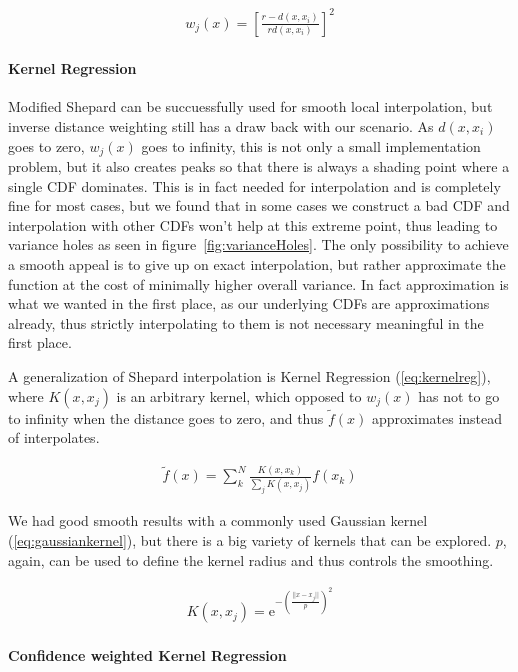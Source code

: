 \begin{align}\label{eq:modshep}
w_j(x) = \left[ \frac{ r - d(x, x_i)}{ rd(x, x_i) } \right]^2
\end{align}

\paragraph{Kernel Regression}

Modified Shepard can be succuessfully used for smooth local interpolation, but inverse distance weighting still has a draw back with our scenario. As $d(x, x_i)$ goes to zero, $w_j(x)$ goes to infinity, this is not only a small implementation problem, but it also creates peaks so that there is always a shading point where a single CDF dominates. This is in fact needed for interpolation and is completely fine for most cases, but we found that in some cases we construct a bad CDF and interpolation with other CDFs won't help at this extreme point, thus leading to variance holes as seen in figure~\ref{fig:varianceHoles}. The only possibility to achieve a smooth appeal is to give up on exact interpolation, but rather approximate the function at the cost of minimally higher overall variance. In fact approximation is what we wanted in the first place, as our underlying CDFs are approximations already, thus strictly interpolating to them is not necessary meaningful in the first place.

A generalization of Shepard interpolation is Kernel Regression (\ref{eq:kernelreg}), where $K(x, x_j)$ is an arbitrary kernel, which opposed to $w_j(x)$ has not to go to infinity when the distance goes to zero, and thus $\widetilde{f}(x)$ approximates instead of interpolates. 

\begin{align}\label{eq:kernelreg}
\widetilde{f}(x) = \sum_{k}^{N}\frac{K(x,x_k)}{\sum\nolimits_{j}K(x, x_j)}f(x_k)
\end{align}

We had good smooth results with a commonly used Gaussian kernel (\ref{eq:gaussiankernel}), but there is a big variety of kernels that can be explored. $p$, again, can be used to define the kernel radius and thus controls the smoothing.

\begin{align}\label{eq:gaussiankernel}
K(x, x_j) = \mathrm{e}^{-\left(\frac{||x-x_j||}{p}\right)^2}
\end{align}

\paragraph{Confidence weighted Kernel Regression}

